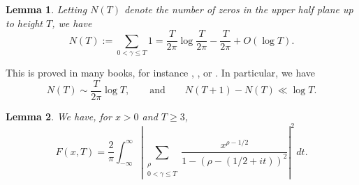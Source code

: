 \documentclass{amsart}
\newcommand{\1}{\mathbbm{1}}
\newtheorem{lem}{Lemma}
\theoremstyle{remark}
\numberwithin{equation}{section}
\begin{document}
\begin{lem}\label{lem2} Letting $N(T)$ denote the number of zeros in the upper half plane up to height $T$, we have
\begin{equation}\label{N(T)} N(T) := \sum_{0 < \gamma \le T} 1= \frac{T}{2\pi} \log \frac{T}{2 \pi} - \frac{T}{2\pi} + O(\log T). \end{equation}
\end{lem}
\noindent This is proved in many books, for instance \cite[Theorem 25]{Ingham1932}, \cite[Theorem 9.4]{Titchmarsh}, or \cite[Corollary 14.3]{MontgomeryVaughan2007}. 
In particular, we have 
\begin{equation}\label{zeroestimte} N(T) \sim \frac{T}{2\pi}\log T ,\qquad \text{and}\qquad N(T+1)-N(T) \ll \log T. \end{equation}

\begin{lem}\label{lem3}
We have, for $x>0$ and $T\ge 3$,
\begin{equation}\label{lem3eq} F(x,T) = \frac{2}{\pi} \int_{-\infty}^{\infty} \left|\sum_{\substack{\rho \\ 0<\gamma \le T}} \frac{x^{\rho-1/2}}{1-\left(\rho-(1/2+it)\right)^2} \right|^2 \, dt. \end{equation}
\end{lem}
\end{document}
